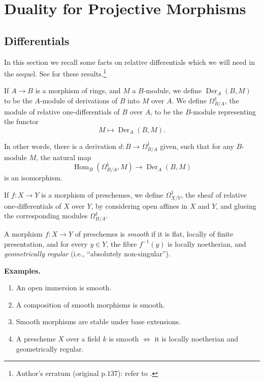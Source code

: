 
\chapter{Duality for Projective Morphisms}
\begingroup
\setlength{\emergencystretch}{2em}
\section{Differentials}\label{sec:3.1}

In this section we recall some facts on relative differentials which we will need in the sequel. See \cite[--61, expos\'e~II]{SGA} for these results.\footnote{Author's erratum (original p.137): refer to \cite[\nopp IV,~\S16]{EGA}.}

\begin{definition*}
If $A\to B$ is a morphism of rings, and $M$ a $B$-module, we define $\operatorname{Der}_A(B,M)$ to be the $A$-module of derivations of $B$ into $M$ over $A$. We define $\Omega^1_{B/A}$, the module of relative one-differentials of $B$ over $A$, to be the $B$-module representing the functor
\[
M \longmapsto \operatorname{Der}_A(B,M).
\]

In other words, there is a derivation $d\colon B\to\Omega^1_{B/A}$ given, such that for any $B$-module $M$, the natural map
\[
\operatorname{Hom}_B(\Omega^1_{B/A}, M) \longrightarrow \operatorname{Der}_A(B,M)
\]
is an isomorphism.
\end{definition*}

If $f\colon X\to Y$ is a morphism of preschemes, we define $\Omega^1_{X/Y}$, the sheaf of relative one-differentials of $X$ over $Y$, by considering open affines in $X$ and $Y$, and glueing the corresponding modules $\Omega^1_{B/A}$.

\begin{definition*}
\cite[\nopp IV,~6.8.1]{EGA} A morphism $f\colon X\to Y$ of preschemes is \emph{smooth} if it is flat, locally of finite presentation, and for every $y\in Y$, the fibre $f^{-1}(y)$ is locally noetherian, and \emph{geometrically regular} (i.e., ``absolutely non-singular'').
\end{definition*}

\textbf{Examples.}
\begin{enumerate}
\item An open immersion is smooth.
\item A composition of smooth morphisms is smooth.
\item Smooth morphisms are stable under base extensions.
\item A prescheme $X$ over a field $k$ is smooth $\iff$ it is locally noetherian and geometrically regular.
\end{enumerate}

